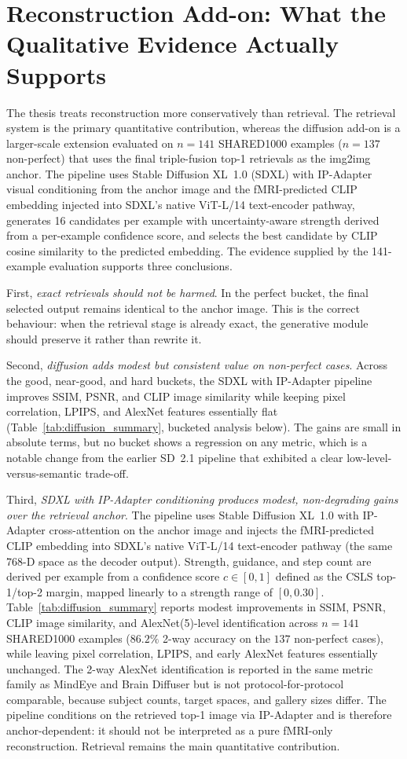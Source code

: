 \section{Reconstruction Add-on: What the Qualitative Evidence Actually Supports}

The thesis treats reconstruction more conservatively than retrieval. The retrieval system is the primary quantitative contribution, whereas the diffusion add-on is a larger-scale extension evaluated on $n{=}141$ SHARED1000 examples ($n{=}137$ non-perfect) that uses the final triple-fusion top-1 retrievals as the img2img anchor. The pipeline uses Stable Diffusion XL~1.0 (SDXL) with IP-Adapter visual conditioning from the anchor image and the fMRI-predicted CLIP embedding injected into SDXL's native ViT-L/14 text-encoder pathway, generates 16 candidates per example with uncertainty-aware strength derived from a per-example confidence score, and selects the best candidate by CLIP cosine similarity to the predicted embedding. The evidence supplied by the 141-example evaluation supports three conclusions.

First, \emph{exact retrievals should not be harmed}. In the perfect bucket, the final selected output remains identical to the anchor image. This is the correct behaviour: when the retrieval stage is already exact, the generative module should preserve it rather than rewrite it.

Second, \emph{diffusion adds modest but consistent value on non-perfect cases}. Across the good, near-good, and hard buckets, the SDXL with IP-Adapter pipeline improves SSIM, PSNR, and CLIP image similarity while keeping pixel correlation, LPIPS, and AlexNet features essentially flat (Table~\ref{tab:diffusion_summary}, bucketed analysis below). The gains are small in absolute terms, but no bucket shows a regression on any metric, which is a notable change from the earlier SD~2.1 pipeline that exhibited a clear low-level-versus-semantic trade-off.

Third, \emph{SDXL with IP-Adapter conditioning produces modest, non-degrading gains over the retrieval anchor}. The pipeline uses Stable Diffusion XL~1.0 with IP-Adapter cross-attention on the anchor image and injects the fMRI-predicted CLIP embedding into SDXL's native ViT-L/14 text-encoder pathway (the same 768-D space as the decoder output). Strength, guidance, and step count are derived per example from a confidence score $c \in [0,1]$ defined as the CSLS top-1/top-2 margin, mapped linearly to a strength range of $[0,0.30]$. Table~\ref{tab:diffusion_summary} reports modest improvements in SSIM, PSNR, CLIP image similarity, and AlexNet(5)-level identification across $n=141$ SHARED1000 examples ($86.2\%$ 2-way accuracy on the $137$ non-perfect cases), while leaving pixel correlation, LPIPS, and early AlexNet features essentially unchanged. The 2-way AlexNet identification is reported in the same metric family as MindEye and Brain Diffuser but is not protocol-for-protocol comparable, because subject counts, target spaces, and gallery sizes differ. The pipeline conditions on the retrieved top-1 image via IP-Adapter and is therefore anchor-dependent: it should not be interpreted as a pure fMRI-only reconstruction. Retrieval remains the main quantitative contribution.

